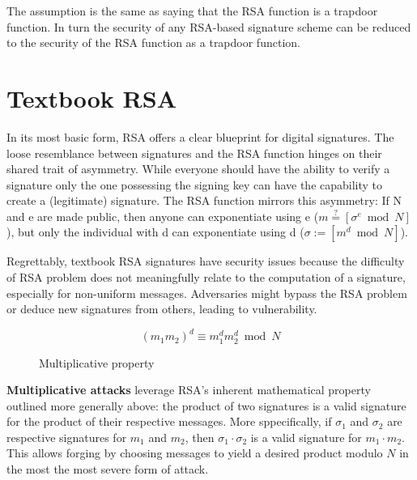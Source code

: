 \documentclass[]{final_report}
\theoremstyle{definition}
\begin{document}
The assumption is the same as saying that the RSA function is a trapdoor function. In turn the security of any RSA-based signature scheme can be reduced to the security of the RSA function as a trapdoor function.


\section{Textbook RSA}
In its most basic form, RSA offers a clear blueprint for digital signatures. The loose resemblance between signatures and the RSA function hinges on their shared trait of asymmetry. While everyone should have the ability to verify a signature only the one possessing the signing key can have the capability to create a (legitimate) signature. The RSA function mirrors this asymmetry: If N and e are made public, then anyone can exponentiate using e ($m \stackrel{?}{=} [\sigma^e \bmod N]$), but only the individual with d can exponentiate using d ($\sigma := [m^d \bmod N]$). 

Regrettably, textbook RSA signatures have security issues because the difficulty of RSA problem does not meaningfully relate to the computation of a signature, especially for non-uniform messages. Adversaries might bypass the RSA problem or deduce new signatures from others, leading to vulnerability.


\begin{figure}[H]
\caption{Multiplicative property}
\begin{equation}
(m_{1}m_{2})^{d} \equiv m_{1}^{d}m_{2}^{d} \bmod N
\end{equation}

\end{figure}
\textbf{Multiplicative attacks} leverage RSA’s inherent mathematical property outlined more generally above: the product of two signatures is a valid signature for the product of their respective messages. More sppecifically, if \( \sigma_{1} \) and \( \sigma_{2} \) are respective signatures for \( m_{1} \) and \( m_{2} \), then \( \sigma_{1} \cdot \sigma_{2} \) is a valid signature for \( m_{1} \cdot m_{2} \). This allows forging by choosing messages to yield a desired product modulo \( N \) in the most the most severe form of attack.

\end{document}
